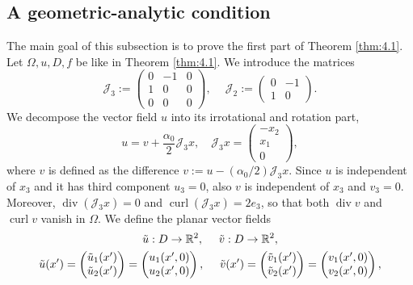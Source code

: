 \documentclass[10pt,reqno,a4paper]{article}
\numberwithin{equation}{section}
\theoremstyle{plain}
\theoremstyle{definition}
\newcommand{\R}{{\mathbb R}}
\newcommand{\mJ}{\mathcal{J}}
\renewcommand{\a}{\alpha}
\newcommand{\Om}{\Omega}
\renewcommand{\div}{\operatorname{div}} %
\newcommand{\curl}{\operatorname{curl}}
\begin{document}
\subsection{A geometric-analytic condition}\label{sub:equation}
The main goal of this subsection is to prove the first part of Theorem \ref{thm:4.1}. 
Let $\Omega, u, D, f$ be like in Theorem \ref{thm:4.1}.
We introduce the matrices
\begin{equation} \label{def.mJ.2.3}
\mJ_3 :=
\begin{pmatrix}
0 &-1& 0
\\
1&0&0
\\
0&0& 0
\end{pmatrix}, 
\quad \ 
\mJ_2 :=
\begin{pmatrix}
0 &-1 
\\
1&0
\end{pmatrix}.
\end{equation}
We decompose the vector field $u$ into its irrotational and rotation part, 
\begin{equation}\label{eq:ansatz}
u = v + \frac{\a_0}{2} \mJ_3 x, 
\quad \mJ_3 x = \begin{pmatrix} - x_2 \\ x_1 \\ 0 \end{pmatrix},
\end{equation}
where $v$ is defined as the difference $v := u - (\alpha_0/2) \mJ_3 x$.
Since $u$ is independent of $x_3$ and it has third component $u_3 = 0$,
also $v$ is independent of $x_3$ and $v_3 = 0$.  
Moreover, $\div(\mJ_3 x) = 0$ and $\curl(\mJ_3 x) = 2 e_3$, 
so that both $\div v$ and $\curl v$ vanish in $\Om$.
We define the planar vector fields 
\begin{gather}
\tilde u : D \to \R^2, \quad \ 
\tilde v : D \to \R^2, 
\notag \\
\tilde u(x') 
= \begin{pmatrix} \tilde u_1(x') \\  \tilde u_2(x') \end{pmatrix} 
= \begin{pmatrix} u_1(x',0) \\ u_2(x',0) \end{pmatrix}, 
\quad \ 
\tilde v(x') 
= \begin{pmatrix} \tilde v_1(x') \\  \tilde v_2(x') \end{pmatrix} 
= \begin{pmatrix} v_1(x',0) \\ v_2(x',0) \end{pmatrix}, 
\label{def.tilde.u.tilde.v}
\end{gather}
\end{document}
